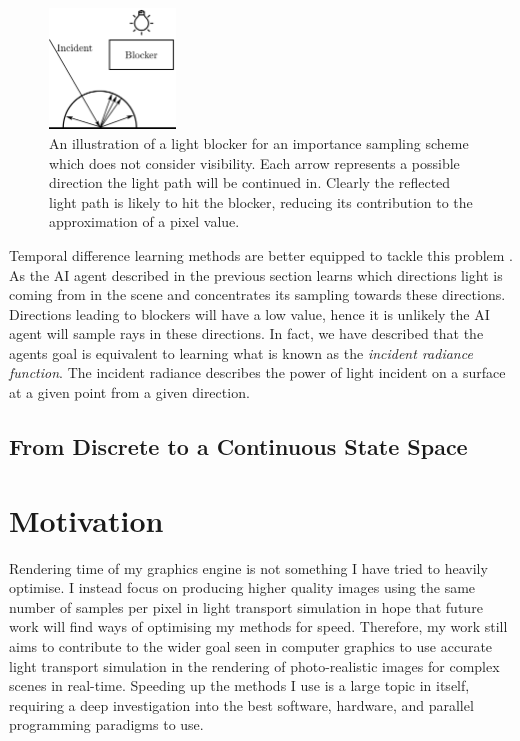 \documentclass[../dissertation.tex]{subfiles}
\begin{document}
\begin{figure}[h!]
\begin{center}
\includegraphics[width=0.3\textwidth]{images/light_blocker.png}    
\end{center}
\caption{An illustration of a light blocker for an importance sampling scheme which does not consider visibility. Each arrow represents a possible direction the light path will be continued in. Clearly the reflected light path is likely to hit the blocker, reducing its contribution to the approximation of a pixel value.}
\label{fig:blocker}
\end{figure}

Temporal difference learning methods are better equipped to tackle this problem \cite{dahm2017learning}. As the AI agent described in the previous section learns which directions light is coming from in the scene and concentrates its sampling towards these directions. Directions leading to blockers will have a low value, hence it is unlikely the AI agent will sample rays in these directions. In fact, we have described that the agents goal is equivalent to learning what is known as the \textit{incident radiance function}. The incident radiance describes the power of light incident on a surface at a given point from a given direction.

\subsection{From Discrete to a Continuous State Space}

\section{Motivation}
\label{sec:motivation}

Rendering time of my graphics engine is not something I have tried to heavily 
optimise. I instead focus on producing higher quality images using the same 
number of samples per pixel in light transport simulation in hope that future 
work will find ways of optimising my methods for speed. Therefore, my work 
still aims to contribute to the wider goal seen in computer graphics to use 
accurate light transport simulation in the rendering of photo-realistic images 
for complex scenes in real-time.  Speeding up the methods I use is a large 
topic in itself, requiring a deep investigation into the best software, hardware, 
and parallel programming paradigms to use.\\
\end{document}
